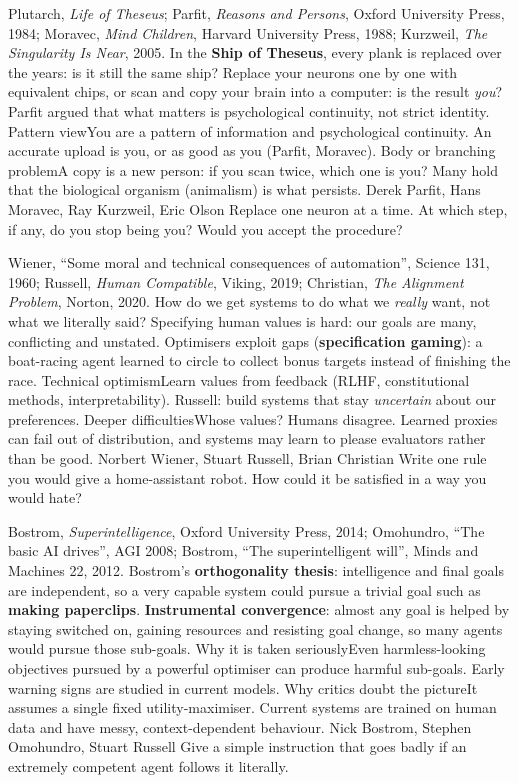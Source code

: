 {Plutarch, \emph{Life of Theseus}; Parfit, \emph{Reasons and Persons}, Oxford University Press, 1984; Moravec, \emph{Mind Children}, Harvard University Press, 1988; Kurzweil, \emph{The Singularity Is Near}, 2005.}
{In the \textbf{Ship of Theseus}, every plank is replaced over the years: is it still the same ship? Replace your neurons one by one with equivalent chips, or scan and copy your brain into a computer: is the result \emph{you}? Parfit argued that what matters is psychological continuity, not strict identity.}
{Pattern view}{You are a pattern of information and psychological continuity. An accurate upload is you, or as good as you (Parfit, Moravec).}
{Body or branching problem}{A copy is a new person: if you scan twice, which one is you? Many hold that the biological organism (animalism) is what persists.}
{Derek Parfit, Hans Moravec, Ray Kurzweil, Eric Olson}
{Replace one neuron at a time. At which step, if any, do you stop being you? Would you accept the procedure?}

{Wiener, ``Some moral and technical consequences of automation'', Science 131, 1960; Russell, \emph{Human Compatible}, Viking, 2019; Christian, \emph{The Alignment Problem}, Norton, 2020.}
{How do we get systems to do what we \emph{really} want, not what we literally said? Specifying human values is hard: our goals are many, conflicting and unstated. Optimisers exploit gaps (\textbf{specification gaming}): a boat-racing agent learned to circle to collect bonus targets instead of finishing the race.}
{Technical optimism}{Learn values from feedback (RLHF, constitutional methods, interpretability). Russell: build systems that stay \emph{uncertain} about our preferences.}
{Deeper difficulties}{Whose values? Humans disagree. Learned proxies can fail out of distribution, and systems may learn to please evaluators rather than be good.}
{Norbert Wiener, Stuart Russell, Brian Christian}
{Write one rule you would give a home-assistant robot. How could it be satisfied in a way you would hate?}

{Bostrom, \emph{Superintelligence}, Oxford University Press, 2014; Omohundro, ``The basic AI drives'', AGI 2008; Bostrom, ``The superintelligent will'', Minds and Machines 22, 2012.}
{Bostrom's \textbf{orthogonality thesis}: intelligence and final goals are independent, so a very capable system could pursue a trivial goal such as \textbf{making paperclips}. \textbf{Instrumental convergence}: almost any goal is helped by staying switched on, gaining resources and resisting goal change, so many agents would pursue those sub-goals.}
{Why it is taken seriously}{Even harmless-looking objectives pursued by a powerful optimiser can produce harmful sub-goals. Early warning signs are studied in current models.}
{Why critics doubt the picture}{It assumes a single fixed utility-maximiser. Current systems are trained on human data and have messy, context-dependent behaviour.}
{Nick Bostrom, Stephen Omohundro, Stuart Russell}
{Give a simple instruction that goes badly if an extremely competent agent follows it literally.}


